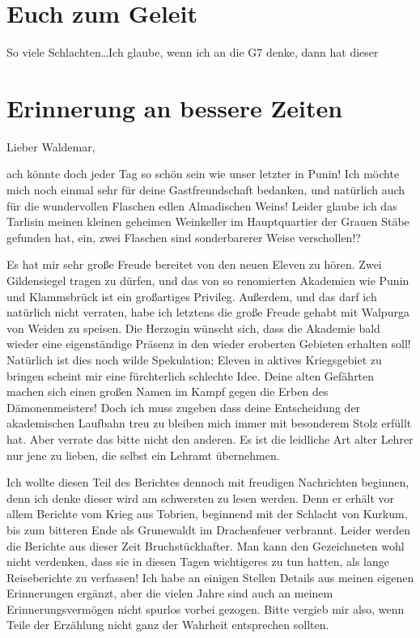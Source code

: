 \chapter{Euch zum Geleit}
So viele Schlachten\dots Ich glaube, wenn ich an die G7 denke, dann hat dieser 

\chapter{Erinnerung an bessere Zeiten}
Lieber Waldemar,

ach könnte doch jeder Tag so schön sein wie unser letzter in Punin!
Ich möchte mich noch einmal sehr für deine Gastfreundschaft bedanken, und natürlich auch für die wundervollen Flaschen edlen Almadischen Weins!
Leider glaube ich das Tarlisin meinen kleinen geheimen Weinkeller im Hauptquartier der Grauen Stäbe gefunden hat, ein, zwei Flaschen sind sonderbarerer Weise verschollen!?

Es hat mir sehr große Freude bereitet von den neuen Eleven zu hören. Zwei Gildensiegel tragen zu dürfen, und das von so renomierten Akademien wie Punin und Klammsbrück ist ein großartiges Privileg. Außerdem, und das darf ich natürlich nicht verraten, habe ich letztens die große Freude gehabt mit Walpurga von Weiden zu speisen. Die Herzogin wünscht sich, dass die Akademie bald wieder eine eigenständige Präsenz in den wieder eroberten Gebieten erhalten soll!
Natürlich ist dies noch wilde Spekulation; Eleven in aktives Kriegsgebiet zu bringen scheint mir eine fürchterlich schlechte Idee.
Deine alten Gefährten machen sich einen großen Namen im Kampf gegen die Erben des Dämonenmeisters! Doch ich muss zugeben dass deine Entscheidung der akademischen Laufbahn treu zu bleiben mich immer mit besonderem Stolz erfüllt hat. Aber verrate das bitte nicht den anderen. Es ist die leidliche Art alter Lehrer nur jene zu lieben, die selbst ein Lehramt übernehmen.

Ich wollte diesen Teil des Berichtes dennoch mit freudigen Nachrichten beginnen, denn ich denke dieser wird am schwersten zu lesen werden. Denn er erhält vor allem Berichte vom Krieg aus Tobrien, beginnend mit der Schlacht von Kurkum, bis zum bitteren Ende als Grunewaldt im Drachenfeuer verbrannt.
Leider werden die Berichte aus dieser Zeit Bruchstückhafter. Man kann den Gezeichneten wohl nicht verdenken, dass sie in diesen Tagen wichtigeres zu tun hatten, als lange Reiseberichte zu verfassen!
Ich habe an einigen Stellen Details aus meinen eigenen Erinnerungen ergänzt, aber die vielen Jahre sind auch an meinem Erinnerungsvermögen nicht spurlos vorbei gezogen.
Bitte vergieb mir also, wenn Teile der Erzählung nicht ganz der Wahrheit entsprechen sollten.

